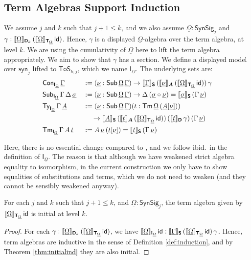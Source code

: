 \documentclass[sigplan,review,anonymous]{acmart}\settopmatter{printfolios=true,printccs=false,printacmref=false}
\newcommand{\ToS}{\mathsf{ToS}}
\newcommand{\syn}{\mathsf{syn}}
\newcommand{\SynSig}{\mathsf{SynSig}}
\newcommand{\bA}{\boldsymbol{A}}
\newcommand{\bT}{\boldsymbol{\mathsf{T}}}
\newcommand{\bS}{\boldsymbol{\mathsf{S}}}
\newcommand{\bD}{\boldsymbol{\mathsf{D}}}
\newcommand{\bI}{\boldsymbol{\mathsf{I}}}
\newcommand{\ul}[1]{\underline{#1}}
\newcommand{\ulGamma}{\ul{\Gamma}}
\newcommand{\ulOmega}{\ul{\Omega}}
\newcommand{\ulsigma}{\ul{\sigma}}
\newcommand{\ulnu}{\ul{\nu}}
\newcommand{\ult}{\ul{t}}
\newcommand{\ulA}{\ul{A}}
\newcommand{\llb}{\llbracket}
\newcommand{\rrb}{\rrbracket}
\begin{document}
\subsection{Term Algebras Support Induction}

\begin{definition} We assume $j$ and $k$ such that $j + 1 \leq k$, and we also assume
$\ulOmega : \SynSig_j$ and $\gamma :
\llb\ulOmega\rrb_{\bD_k}\,(\llb\ulOmega\rrb_{\bT_{\ulOmega}}\,\id)$.  Hence, $\gamma$ is
a displayed $\ulOmega$-algebra over the term algebra, at level $k$. We are using
the cumulativity of $\ulOmega$ here to lift the term algebra appropriately.
We aim to show that $\gamma$ has a section. We define a displayed model over $\syn_j$ lifted
to $\ToS_{k, j}$, which we name $\bI_{\ulOmega}$. The underlying sets are:
\begin{alignat*}{3}
  & \Con_{\bI_{\ulOmega}}\,\ulGamma &&:= (\ulnu : \Sub\,\ulOmega\,\ulGamma)\ra
  \llb\ulGamma\rrb_{\bS}\,(\llb\ulnu\rrb_{\bA}\,(\llb\ulOmega\rrb_{\bT_{\ulOmega}}\,\id))\,\gamma\\
  & \Sub_{\bI_{\ulOmega}}\,\Gamma\,\Delta\,\ulsigma && := (\ulnu : \Sub\,\ulOmega\,\ulGamma)\ra
    \Delta\,(\ulsigma\circ\ulnu) = \llb\ulsigma\rrb_{\bS}\,(\Gamma\,\ulnu)\\
  & \Ty_{\bI_{\ulOmega}}\,\Gamma\,\ulA &&:=
  (\ulnu : \Sub\,\ulOmega\,\ulGamma)(t : \Tm\,\ulOmega\,(\ulA[\ulnu]))\\
  & && \hspace{1.2em}\ra
  \llb\ulA\rrb_{\bS}\,(\llb\ult\rrb_{\bA}\,(\llb\ulOmega\rrb_{\bT_{\ulOmega}}\,\id))\,
  (\llb\ult\rrb_{\bD}\,\gamma)\,(\Gamma\,\ulnu)\\
  & \Tm_{\bI_{\ulOmega}}\,\Gamma\,A\,\ult &&:= A\,\ulnu\,(\ult[\ulnu]) = \llb\ult\rrb_{\bS}\,(\Gamma\,\ulnu)
\end{alignat*}

Here, there is no essential change compared to \cite{kaposi2019constructing},
and we follow ibid.\ in the definition of $\bI_{\ulOmega}$. The reason is that although we
have weakened strict algebra equality to isomorphism, in the current
construction we only have to show equalities of substitutions and terms, which
we do not need to weaken (and they cannot be sensibly weakened anyway).
\end{definition}

\begin{theorem} For each $j$ and $k$ such that $j + 1 \leq k$, and $\ulOmega : \SynSig_j$, the term algebra given by $\llb\ulOmega\rrb_{\bT_{\ulOmega}}\,\id$ is initial at level $k$.
\end{theorem}
\begin{proof}
For each $\gamma :
\llb\ulOmega\rrb_{\bD_k}\,(\llb\ulOmega\rrb_{\bT_{\ulOmega}}\,\id)$, we have
$\llb\ulOmega\rrb_{\bI_{\ulOmega}}\,\id :
\llb\ulGamma\rrb_{\bS}\,(\llb\ulOmega\rrb_{\bT_{\ulOmega}}\,\id)\,\gamma$. Hence,
term algebras are inductive in the sense of Definition \ref{def:induction}, and
by Theorem \ref{thm:initialind} they are also initial.
\end{proof}
\end{document}
